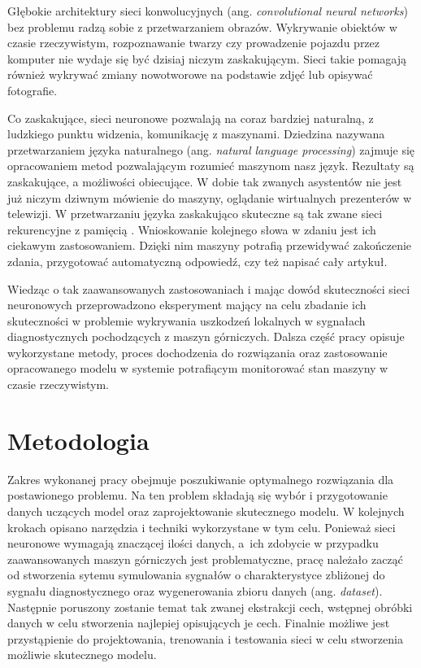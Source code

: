 \documentclass[inzynierska]{pwr_wmat_praca_dyplomowa}
\theoremstyle{plain}
\numberwithin{theorem}{chapter}
\theoremstyle{definition}
\numberwithin{theorem}{chapter}
\begin{document}
Głębokie architektury sieci konwolucyjnych (ang. \textit{convolutional neural networks}) bez problemu radzą sobie z przetwarzaniem obrazów. Wykrywanie obiektów w czasie rzeczywistym\cite{ren2015faster}, rozpoznawanie twarzy\cite{lin1997face} czy prowadzenie pojazdu\cite{bojarski2016end} przez komputer nie wydaje się być dzisiaj niczym zaskakującym. Sieci takie pomagają również wykrywać zmiany nowotworowe na podstawie zdjęć\cite{nnnature} lub opisywać fotografie\cite{xu2015show}.

Co zaskakujące, sieci neuronowe pozwalają na coraz bardziej naturalną, z ludzkiego punktu widzenia, komunikację z maszynami. Dziedzina nazywana przetwarzaniem języka naturalnego (ang. \textit{natural language processing}) zajmuje się opracowaniem metod pozwalającym rozumieć maszynom nasz język\cite{nnspeech}. Rezultaty są zaskakujące, a możliwości obiecujące. W dobie tak zwanych asystentów nie jest już niczym dziwnym mówienie do maszyny, oglądanie wirtualnych prezenterów w telewizji. W przetwarzaniu języka zaskakująco skuteczne są tak zwane sieci rekurencyjne z pamięcią \cite{tai2015improved}.  Wnioskowanie kolejnego słowa w zdaniu jest ich ciekawym zastosowaniem. Dzięki nim maszyny potrafią przewidywać zakończenie zdania\cite{nngboard}, przygotować automatyczną odpowiedź, czy też napisać cały artykuł.

Wiedząc o tak zaawansowanych zastosowaniach i mając dowód skuteczności sieci neuronowych przeprowadzono eksperyment mający na celu zbadanie ich skuteczności w problemie wykrywania uszkodzeń lokalnych w sygnałach diagnostycznych pochodzących z maszyn górniczych. Dalsza część pracy opisuje wykorzystane metody, proces dochodzenia do rozwiązania oraz zastosowanie opracowanego modelu w systemie potrafiącym monitorować stan maszyny w czasie rzeczywistym.

\chapter{Metodologia}
Zakres wykonanej pracy obejmuje poszukiwanie optymalnego rozwiązania dla postawionego problemu. Na ten problem składają się wybór i przygotowanie danych uczących model oraz zaprojektowanie skutecznego modelu. 
W kolejnych krokach opisano narzędzia i techniki wykorzystane w tym celu. Ponieważ sieci neuronowe wymagają znaczącej ilości danych, a~ich zdobycie w przypadku zaawansowanych maszyn górniczych jest problematyczne, pracę należało zacząć od stworzenia sytemu symulowania sygnałów o charakterystyce zbliżonej do sygnału diagnostycznego oraz wygenerowania zbioru danych (ang. \textit{dataset}). Następnie poruszony zostanie temat tak zwanej ekstrakcji cech, wstępnej obróbki danych w celu stworzenia najlepiej opisujących je cech. Finalnie możliwe jest przystąpienie do projektowania, trenowania i testowania sieci w celu stworzenia możliwie skutecznego modelu.
\end{document}
